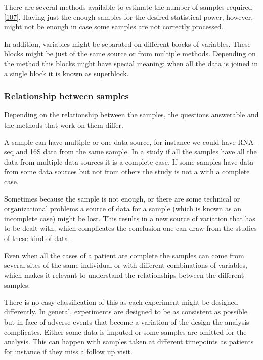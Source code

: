\documentclass[
  12pt,
  a4paper,
  twoside,
  openright]{book}
\begin{document}
There are several methods available to estimate the number of samples required {[}\protect\hyperlink{ref-tarazona2020}{107}{]}.
Having just the enough samples for the desired statistical power, however, might not be enough in case some samples are not correctly processed.

In addition, variables might be separated on different blocks of variables.
These blocks might be just of the same source or from multiple methods.
Depending on the method this blocks might have special meaning: when all the data is joined in a single block it is known as superblock.

\hypertarget{relationship-between-samples}{%
\subsubsection{Relationship between samples}\label{relationship-between-samples}}

Depending on the relationship between the samples, the questions answerable and the methods that work on them differ.

A sample can have multiple or one data source, for instance we could have RNA-seq and 16S data from the same sample.
In a study if all the samples have all the data from multiple data sources it is a complete case.
If some samples have data from some data sources but not from others the study is not a with a complete case.

Sometimes because the sample is not enough, or there are some technical or organizational problems a source of data for a sample (which is known as an incomplete case) might be lost.
This results in a new source of variation that has to be dealt with, which complicates the conclusion one can draw from the studies of these kind of data.

Even when all the cases of a patient are complete the samples can come from several sites of the same individual or with different combinations of variables, which makes it relevant to understand the relationships between the different samples.

There is no easy classification of this as each experiment might be designed differently.
In general, experiments are designed to be as consistent as possible but in face of adverse events that become a variation of the design the analysis complicates.
Either some data is imputed or some samples are omitted for the analysis.
This can happen with samples taken at different timepoints as patients for instance if they miss a follow up visit.
\end{document}

